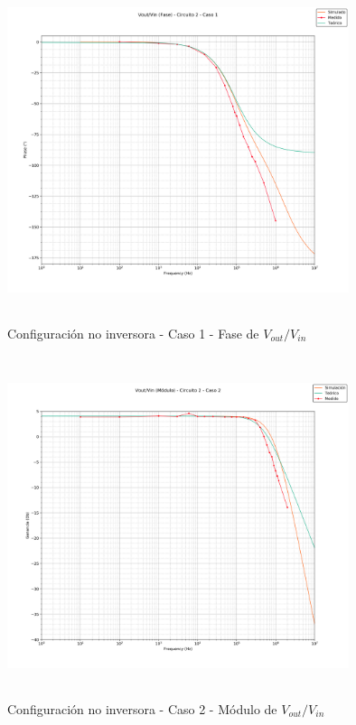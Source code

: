 \begin{figure}[H] %
	\centering
	\includegraphics[width=10cm,height=10cm,keepaspectratio]{../EJ1/00GRAFICOS/c2c1/c2c1voviFASE.png}
	\caption{Configuración no inversora - Caso 1 - Fase de $V_{out}/V_{in}$}
	\label{c2c1voviP}
\end{figure}

\begin{figure}[H] %
	\centering
	\includegraphics[width=10cm,height=10cm,keepaspectratio]{../EJ1/00GRAFICOS/c2c2/c2c2voviMod.png}
	\caption{Configuración no inversora - Caso 2 - M\'odulo de $V_{out}/V_{in}$}
	\label{c2c2voviM}
\end{figure}

